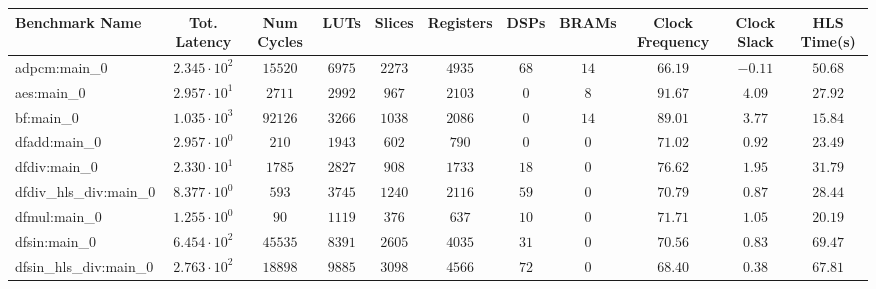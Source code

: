 \begin{tabular}{|l|c|c|c|c|c|c|c|c|c|c|}
\hline
Benchmark Name          & Tot. Latency           & Num Cycles & LUTs      & Slices    & Registers & DSPs    & BRAMs   & Clock Frequency & Clock Slack & HLS Time(s) \\
\hline
adpcm:main\_0           & $ 2.345 \cdot 10^{2} $ & $ 15520  $ & $ 6975  $ & $ 2273  $ & $ 4935  $ & $ 68  $ & $ 14  $ & $ 66.19       $ & $ -0.11   $ & $ 50.68   $ \\
aes:main\_0             & $ 2.957 \cdot 10^{1} $ & $ 2711   $ & $ 2992  $ & $ 967   $ & $ 2103  $ & $ 0   $ & $ 8   $ & $ 91.67       $ & $ 4.09    $ & $ 27.92   $ \\
bf:main\_0              & $ 1.035 \cdot 10^{3} $ & $ 92126  $ & $ 3266  $ & $ 1038  $ & $ 2086  $ & $ 0   $ & $ 14  $ & $ 89.01       $ & $ 3.77    $ & $ 15.84   $ \\
dfadd:main\_0           & $ 2.957 \cdot 10^{0} $ & $ 210    $ & $ 1943  $ & $ 602   $ & $ 790   $ & $ 0   $ & $ 0   $ & $ 71.02       $ & $ 0.92    $ & $ 23.49   $ \\
dfdiv:main\_0           & $ 2.330 \cdot 10^{1} $ & $ 1785   $ & $ 2827  $ & $ 908   $ & $ 1733  $ & $ 18  $ & $ 0   $ & $ 76.62       $ & $ 1.95    $ & $ 31.79   $ \\
dfdiv\_hls\_div:main\_0 & $ 8.377 \cdot 10^{0} $ & $ 593    $ & $ 3745  $ & $ 1240  $ & $ 2116  $ & $ 59  $ & $ 0   $ & $ 70.79       $ & $ 0.87    $ & $ 28.44   $ \\
dfmul:main\_0           & $ 1.255 \cdot 10^{0} $ & $ 90     $ & $ 1119  $ & $ 376   $ & $ 637   $ & $ 10  $ & $ 0   $ & $ 71.71       $ & $ 1.05    $ & $ 20.19   $ \\
dfsin:main\_0           & $ 6.454 \cdot 10^{2} $ & $ 45535  $ & $ 8391  $ & $ 2605  $ & $ 4035  $ & $ 31  $ & $ 0   $ & $ 70.56       $ & $ 0.83    $ & $ 69.47   $ \\
dfsin\_hls\_div:main\_0 & $ 2.763 \cdot 10^{2} $ & $ 18898  $ & $ 9885  $ & $ 3098  $ & $ 4566  $ & $ 72  $ & $ 0   $ & $ 68.40       $ & $ 0.38    $ & $ 67.81   $ \\

\end{tabular}
